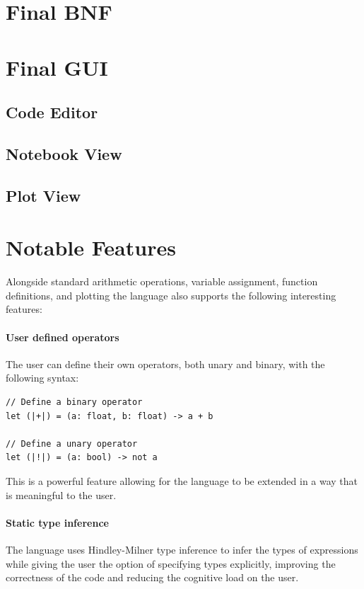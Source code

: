 \section{Final BNF}\label{sec:final-bnf}



\section{Final GUI}\label{sec:final-gui}

\subsection{Code Editor}\label{subsec:code-editor}

\subsection{Notebook View}\label{subsec:notebook-view}

\subsection{Plot View}\label{subsec:plot-view}

\section{Notable Features}\label{sec:notable-features}

Alongside standard arithmetic operations, variable assignment, function definitions, and plotting the language also 
supports the following interesting features:

\paragraph{User defined operators} The user can define their own operators, both unary and binary, with the 
following syntax:

\begin{verbatim}
// Define a binary operator
let (|+|) = (a: float, b: float) -> a + b

// Define a unary operator
let (|!|) = (a: bool) -> not a
\end{verbatim}

This is a powerful feature allowing for the language to be extended in a way that is meaningful to the user.

\paragraph{Static type inference} The language uses Hindley-Milner type inference to infer the types of
expressions while giving the user the option of specifying types explicitly, improving the correctness of the
code and reducing the cognitive load on the user.


